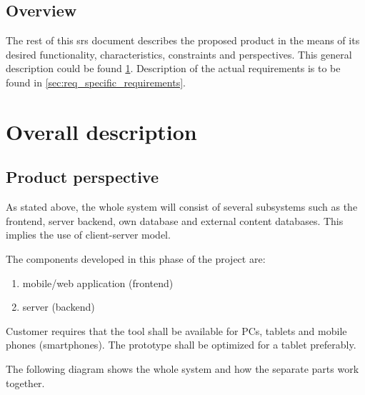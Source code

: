 \documentclass[11pt]{book}
\begin{document}
\subsection{Overview}
The rest of this \gls{srs} document describes the proposed product in the means of its desired functionality, characteristics, constraints and perspectives. This general description could be found \ref{sec:req_overall_description}. Description of the actual requirements is to be found in \ref{sec:req_specific_requirements}.

\section{Overall description}\label{sec:req_overall_description}
\subsection{Product perspective}
As stated above, the whole system will consist of several subsystems such as the frontend, server backend, own database and external content databases. This implies the use of client-server model.

The components developed in this phase of the project are:

\begin{enumerate}
  \item mobile/web application (frontend)
  \item server (backend)
\end{enumerate}

Customer requires that the tool shall be available for PCs, tablets and mobile phones (smartphones). The prototype shall be optimized for a tablet preferably.

The following diagram shows the whole system and how the separate parts work together.
\end{document}
